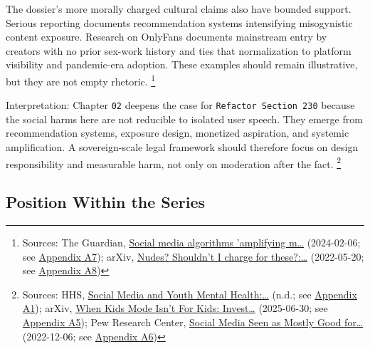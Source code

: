\documentclass[
  american,
  11pt,
  letterpaper,
]{article}
\begin{document}
The dossier's more morally charged cultural claims also have bounded
support. Serious reporting documents recommendation systems intensifying
misogynistic content exposure. Research on OnlyFans documents mainstream
entry by creators with no prior sex-work history and ties that
normalization to platform visibility and pandemic-era adoption. These
examples should remain illustrative, but they are not empty rhetoric.
\footnote{Sources: The Guardian,
  \href{https://www.theguardian.com/media/2024/feb/06/social-media-algorithms-amplifying-misogynistic-content}{Social
  media algorithms 'amplifying m\ldots{}} (2024-02-06; see
  \hyperref[ch-02-appendix-a7-social-media-algorithms-amplifying-misogynistic-content]{Appendix
  A7}); arXiv, \href{https://arxiv.org/abs/2205.10425}{Nudes? Shouldn't
  I charge for these?:\ldots{}} (2022-05-20; see
  \hyperref[ch-02-appendix-a8-nudes-shouldn-t-i-charge-for-these-motivations-of-new-sexual-content-creators-on-onlyfans]{Appendix
  A8})}

Interpretation: Chapter \texttt{02} deepens the case for
\texttt{Refactor\ Section\ 230} because the social harms here are not
reducible to isolated user speech. They emerge from recommendation
systems, exposure design, monetized aspiration, and systemic
amplification. A sovereign-scale legal framework should therefore focus
on design responsibility and measurable harm, not only on moderation
after the fact. \footnote{Sources: HHS,
  \href{https://www.hhs.gov/surgeongeneral/priorities/youth-mental-health/social-media/index.html}{Social
  Media and Youth Mental Health:\ldots{}} (n.d.; see
  \hyperref[ch-02-appendix-a1-social-media-and-youth-mental-health-the-u-s-surgeon-general-s-advisory]{Appendix
  A1}); arXiv, \href{https://arxiv.org/abs/2507.00299}{When Kids Mode
  Isn't For Kids: Invest\ldots{}} (2025-06-30; see
  \hyperref[ch-02-appendix-a5-when-kids-mode-isn-t-for-kids-investigating-tiktok-s-under-13-experience]{Appendix
  A5}); Pew Research Center,
  \href{https://www.pewresearch.org/global/2022/12/06/social-media-seen-as-mostly-good-for-democracy-across-many-nations-but-u-s-is-a-major-outlier/}{Social
  Media Seen as Mostly Good for\ldots{}} (2022-12-06; see
  \hyperref[ch-02-appendix-a6-social-media-seen-as-mostly-good-for-democracy-across-many-nations-but-u-s-is-a-major-outlier]{Appendix
  A6})}

\subsection{Position Within the
Series}\label{position-within-the-series-2}
\end{document}
